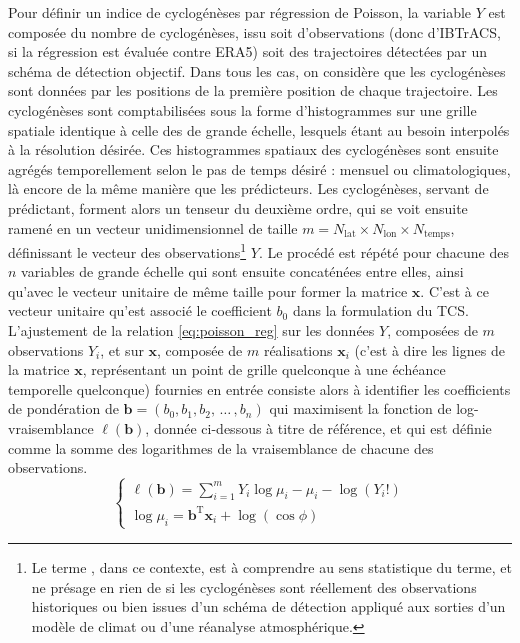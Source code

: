 \documentclass[../main.tex]{subfiles}
\begin{document}
Pour définir un indice de cyclogénèses par régression de Poisson, la variable $Y$ est composée du nombre de cyclogénèses, issu soit d'observations (donc
d'IBTrACS, si la régression est évaluée contre ERA5) soit des trajectoires détectées par un schéma de détection objectif. Dans tous les cas, on considère que
les cyclogénèses sont données par les positions de la première position de chaque trajectoire. Les cyclogénèses sont comptabilisées sous la forme d'histogrammes
sur une grille spatiale identique à celle des de grande échelle, lesquels étant au besoin interpolés à la résolution désirée. Ces histogrammes spatiaux des
cyclogénèses sont ensuite agrégés temporellement selon le pas de temps désiré : mensuel ou climatologiques, là encore de la même manière que les prédicteurs.
Les cyclogénèses, servant de prédictant, forment alors un tenseur du deuxième ordre, qui se voit ensuite ramené en un vecteur unidimensionnel de taille $m =
N_{\mathrm{lat}} \times N_{\mathrm{lon}} \times N_{\mathrm{temps}}$, définissant le vecteur des observations\footnote{Le terme , dans ce
contexte, est à comprendre au sens statistique du terme, et ne présage en rien de si les cyclogénèses sont réellement des observations historiques ou bien
issues d'un schéma de détection appliqué aux sorties d'un modèle de climat ou d'une réanalyse atmosphérique.} $Y$. Le procédé est répété pour chacune des $n$
variables de grande échelle qui sont ensuite concaténées entre elles, ainsi qu'avec le vecteur unitaire de même taille pour former la matrice $\mathbf{x}$.
C'est à ce vecteur unitaire qu'est associé le coefficient $b_0$ dans la formulation du TCS. L'ajustement de la relation \ref{eq:poisson_reg} sur les données
$Y$, composées de $m$ observations $Y_i$, et sur $\mathbf{x}$, composée de $m$ réalisations $\mathbf{x}_i$ (c'est à dire les lignes de la matrice $\mathbf{x}$,
représentant un point de grille quelconque à une échéance temporelle quelconque) fournies en entrée consiste alors à identifier les coefficients de pondération
de $\mathbf{b} = (b_0, b_1, b_2, \, \ldots \, , b_n)$ qui maximisent la fonction de log-vraisemblance $\ell (\mathbf{b})$, donnée ci-dessous à titre de
référence, et qui est définie comme la somme des logarithmes de la vraisemblance de chacune des observations.
%
\begin{equation*}
    \begin{cases}
        \ell(\mathbf{b}) = \sum_{i = 1}^{m} Y_i \log \mu_i - \mu_i - \log(Y_i !) \\
        \log \mu_i = \mathbf{b}^{\mathrm{T}} \mathbf{x}_i + \log ( \cos \phi )
    \end{cases}
\end{equation*}
\end{document}
